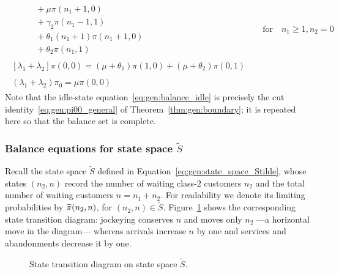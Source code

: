 \begin{align}
\begin{split}
        & \quad \quad + \mu \pi(n_1+1, 0) \\
        & \quad \quad + \gamma_2 \pi(n_1-1, 1) \\
        & \quad \quad + \theta_1(n_1+1) \pi(n_1+1, 0) \\
        & \quad \quad + \theta_2 \pi(n_1,1)
    \end{split}
    && \text{for} \quad n_1 \geq 1, n_2 = 0 \label{eq:gen:balance_x_boundary}\\
    \begin{split}
        \left[\lambda_1+\lambda_2\right]\pi(0,0) = (\mu+\theta_1)\pi(1,0) + (\mu+\theta_2)\pi(0,1)
    \end{split} && \label{eq:gen:balance_zero}\\
    \begin{split}
        (\lambda_1+\lambda_2) \pi_0 = \mu \pi(0,0)
    \end{split} && \label{eq:gen:balance_idle}
\end{align}
Note that the idle-state equation~\eqref{eq:gen:balance_idle} is precisely the cut identity~\eqref{eq:gen:pi00_general} of Theorem~\ref{thm:gen:boundary}; it is repeated here so that the balance set is complete.

\subsubsection{Balance equations for state space \texorpdfstring{$\widetilde{S}$}{S~}}

Recall the state space $\widetilde{S}$ defined in Equation~\eqref{eq:gen:state_space_Stilde}, whose states $(n_2,n)$ record the number of waiting class-$2$ customers $n_2$ and the total number of waiting customers $n=n_1+n_2$. For readability we denote its limiting probabilities by $\widetilde{\pi}(n_2,n)$, for $(n_2,n)\in \widetilde{S}$. Figure~\ref{fig:diagram-gen-stilde} shows the corresponding state transition diagram: jockeying conserves $n$ and moves only $n_2$ ---a horizontal move in the diagram--- whereas arrivals increase $n$ by one and services and abandonments decrease it by one.

\begin{figure}[H]
  \centering
  \resizebox{0.8\textwidth}{!}{%
    
  }
  \caption{State transition diagram on state space $\widetilde{S}$.}
  \label{fig:diagram-gen-stilde}
\end{figure}

